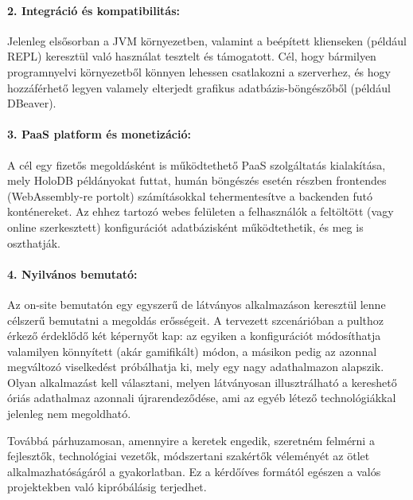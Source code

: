 \documentclass[12pt]{article}
\begin{document}
\paragraph{2. Integráció és kompatibilitás:}
Jelenleg elsősorban a JVM környezetben, valamint a beépített klienseken (például REPL) keresztül való használat tesztelt és támogatott.
Cél, hogy bármilyen programnyelvi környezetből könnyen lehessen csatlakozni a szerverhez,
és hogy hozzáférhető legyen valamely elterjedt grafikus adatbázis-böngészőből (például DBeaver).

\paragraph{3. PaaS platform és monetizáció:}
A cél egy fizetős megoldásként is működtethető \mbox{PaaS} szolgáltatás kialakítása,
mely HoloDB példányokat futtat,
humán böngészés esetén részben frontendes (WebAssembly-re portolt) számításokkal tehermentesítve a backenden futó konténereket.
Az ehhez tartozó webes felületen a felhasználók a feltöltött (vagy online szerkesztett)
konfigurációt adatbázisként működtethetik, és meg is oszthatják.

\paragraph{4. Nyilvános bemutató:}
Az on-site bemutatón egy egyszerű de látványos alkalmazáson keresztül lenne célszerű bemutatni a megoldás erősségeit.
A tervezett szcenárióban a pulthoz érkező érdeklődő két képernyőt kap:
az egyiken a konfigurációt módosíthatja valamilyen könnyített (akár gamifikált) módon,
a másikon pedig az azonnal megváltozó viselkedést próbálhatja ki, mely egy nagy adathalmazon alapszik.
Olyan alkalmazást kell választani, melyen látványosan illusztrálható a kereshető óriás adathalmaz azonnali újrarendeződése,
ami az egyéb létező technológiákkal jelenleg nem megoldható.

Továbbá párhuzamosan, amennyire a keretek engedik,
szeretném felmérni a fejlesztők, technológiai vezetők, módszertani szakértők véleményét az ötlet alkalmazhatóságáról a gyakorlatban.
Ez a kérdőíves formától egészen a valós projektekben való kipróbálásig terjedhet.
\end{document}

